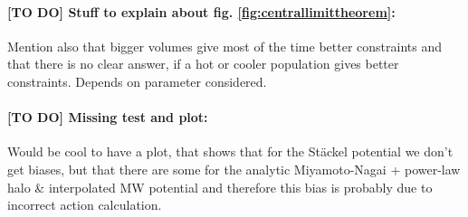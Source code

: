  \paragraph{[TO DO] Stuff to explain about fig. \ref{fig:centrallimittheorem}:} Mention also that bigger volumes give most of the time better constraints and that there is no clear answer, if a hot or cooler population gives better constraints. Depends on parameter considered.


\paragraph{[TO DO] Missing test and plot:}  Would be cool to have a plot, that shows that for the St\"ackel potential we don't get biases, but that there are some for the analytic Miyamoto-Nagai + power-law halo \& interpolated MW potential and therefore this bias is probably due to incorrect action calculation.
